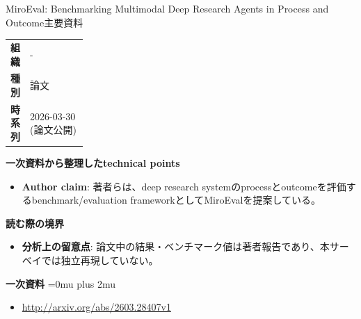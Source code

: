 \begin{technicalnote}{MiroEval: Benchmarking Multimodal Deep Research Agents in Process and Outcome}{主要資料}
\begingroup
\begin{tabularx}{\linewidth}{@{}>{\bfseries}p{0.22\linewidth}X@{}}
組織 & - \\
種別 & 論文 \\
時系列 & 2026-03-30 (論文公開) \\
\end{tabularx}
\smallskip
{\bfseries 一次資料から整理したtechnical points}
\begin{itemize}[leftmargin=1.5em,itemsep=0.35em]
\item \textbf{Author claim}: 著者らは、deep research systemのprocessとoutcomeを評価するbenchmark/evaluation frameworkとしてMiroEvalを提案している。
\end{itemize}
\begin{minipage}{\linewidth}
{\bfseries 読む際の境界}
\begin{itemize}[leftmargin=1.5em,itemsep=0.35em]
\item \textbf{分析上の留意点}: 論文中の結果・ベンチマーク値は著者報告であり、本サーベイでは独立再現していない。
\end{itemize}
\begin{samepage}
{\bfseries 一次資料}
\begingroup\sloppy
\Urlmuskip=0mu plus 2mu\relax
\begin{itemize}[leftmargin=1.5em,itemsep=0.25em]
\item {\scriptsize\url{http://arxiv.org/abs/2603.28407v1}}
\end{itemize}
\endgroup
\end{samepage}
\end{minipage}
\endgroup
\end{technicalnote}
\medskip

